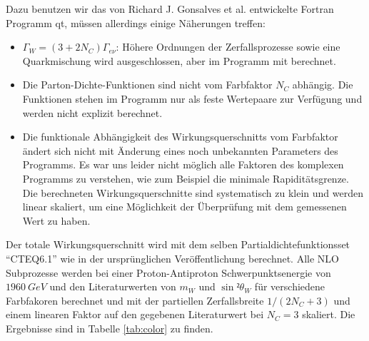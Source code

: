 \documentclass[a4paper,12pt]{article}
\begin{document}
Dazu benutzen wir das von Richard J. Gonsalves et al. entwickelte Fortran Programm qt\cite{qtsite},
müssen allerdings einige Näherungen treffen:
\begin{itemize}
	\item $Γ_W = (3+2N_C)Γ_{eν}$: Höhere Ordnungen der Zerfallsprozesse sowie eine Quarkmischung
		wird ausgeschlossen, aber im Programm mit berechnet.
	\item Die Parton-Dichte-Funktionen sind nicht vom Farbfaktor $N_C$ abhängig. Die Funktionen stehen
		im Programm nur als feste Wertepaare zur Verfügung und werden nicht explizit berechnet.
	\item Die funktionale Abhängigkeit des Wirkungsquerschnitts vom Farbfaktor ändert sich nicht mit
		Änderung eines noch unbekannten Parameters des Programms. Es
		war uns leider nicht möglich alle Faktoren des komplexen Programms zu verstehen, wie zum
		Beispiel die minimale Rapiditätsgrenze. Die berechneten Wirkungsquerschnitte sind
		systematisch zu klein und werden linear skaliert, um eine Möglichkeit der Überprüfung mit dem gemessenen
		Wert zu haben.
\end{itemize}

Der totale Wirkungsquerschnitt wird mit dem selben Partialdichtefunktionsset "`CTEQ6.1"' wie in der ursprünglichen
Veröffentlichung\cite{Abachi:1996ey} berechnet. Alle NLO Subprozesse werden bei einer
Proton-Antiproton Schwerpunktsenergie von $\SI{1960}{GeV}$ und den Literaturwerten von $m_W$ und
$\sin²θ_W$ für verschiedene Farbfakoren berechnet
und mit der partiellen Zerfallsbreite $1/(2N_C +3)$ und einem linearen Faktor auf den gegebenen
Literaturwert bei $N_C = 3$ skaliert.
Die Ergebnisse sind in Tabelle \ref{tab:color} zu finden.
\end{document}
